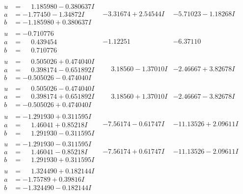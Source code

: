 \documentclass[1p]{elsarticle_modified}
\theoremstyle{definition}
\begin{document}
$$\begin{array}{c|c|c}
\begin{aligned}
u &= \phantom{-}1.185980 - 0.380637 I \\
a &= -1.77450 - 1.34872 I \\
b &= -1.185980 + 0.380637 I\end{aligned}
 & -3.31674 + 2.54544 I & -5.71023 - 1.18268 I \\ \hline\begin{aligned}
u &= -0.710776\phantom{ +0.000000I} \\
a &= \phantom{-}0.439454\phantom{ +0.000000I} \\
b &= \phantom{-}0.710776\phantom{ +0.000000I}\end{aligned}
 & -1.12251\phantom{ +0.000000I} & -6.37110\phantom{ +0.000000I} \\ \hline\begin{aligned}
u &= \phantom{-}0.505026 + 0.474040 I \\
a &= \phantom{-}0.398174 - 0.651892 I \\
b &= -0.505026 - 0.474040 I\end{aligned}
 & \phantom{-}3.18560 - 1.37010 I & -2.46667 + 3.82678 I \\ \hline\begin{aligned}
u &= \phantom{-}0.505026 - 0.474040 I \\
a &= \phantom{-}0.398174 + 0.651892 I \\
b &= -0.505026 + 0.474040 I\end{aligned}
 & \phantom{-}3.18560 + 1.37010 I & -2.46667 - 3.82678 I \\ \hline\begin{aligned}
u &= -1.291930 + 0.311595 I \\
a &= \phantom{-}1.46041 + 0.85218 I \\
b &= \phantom{-}1.291930 - 0.311595 I\end{aligned}
 & -7.56174 - 0.61747 I & -11.13526 + 2.09611 I \\ \hline\begin{aligned}
u &= -1.291930 - 0.311595 I \\
a &= \phantom{-}1.46041 - 0.85218 I \\
b &= \phantom{-}1.291930 + 0.311595 I\end{aligned}
 & -7.56174 + 0.61747 I & -11.13526 - 2.09611 I \\ \hline\begin{aligned}
u &= \phantom{-}1.324490 + 0.182144 I \\
a &= -1.75789 + 0.39816 I \\
b &= -1.324490 - 0.182144 I\end{aligned}

\end{array}$$
\end{document}
